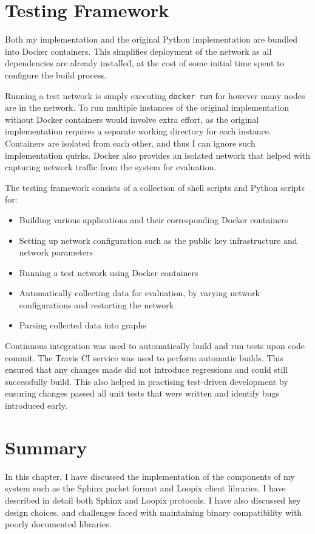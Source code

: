 \documentclass[final,dissertation.tex]{subfiles}
\begin{document}
\section{Testing Framework}

Both my implementation and the original Python implementation are bundled into Docker containers. This simplifies deployment of the network as all dependencies are already installed, at the cost of some initial time spent to configure the build process. 

Running a test network is simply executing \verb|docker run| for however many nodes are in the network. To run multiple instances of the original implementation without Docker containers would involve extra effort, as the original implementation requires a separate working directory for each instance. Containers are isolated from each other, and thus I can ignore such implementation quirks. Docker also provides an isolated network that helped with capturing network traffic from the system for evaluation.

The testing framework consists of a collection of shell scripts and Python scripts for:

\begin{itemize}
	\item Building various applications and their corresponding Docker containers
	\item Setting up network configuration such as the public key infrastructure and network parameters
	\item Running a test network using Docker containers
	\item Automatically collecting data for evaluation, by varying network configurations and restarting the network
	\item Parsing collected data into graphs
\end{itemize}

Continuous integration was used to automatically build and run tests upon code commit. The Travis CI service was used to perform automatic builds. This ensured that any changes made did not introduce regressions and could still successfully build. This also helped in practising test-driven development by ensuring changes passed all unit tests that were written and identify bugs introduced early.

\section{Summary}

In this chapter, I have discussed the implementation of the components of my system such as the Sphinx packet format and Loopix client libraries. I have described in detail both Sphinx and Loopix protocols. I have also discussed key design choices, and challenges faced with maintaining binary compatibility with poorly documented libraries.
\end{document}
